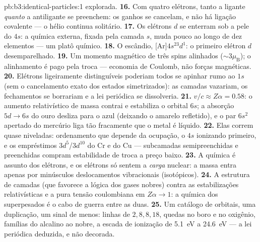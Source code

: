 \begin{solution}{pb:b3:identical-particles:1}
explorada.
\textbf{16.} Com quatro elétrons, tanto a ligante \emph{quanto} a
antiligante se preenchem: os ganhos se cancelam, e não há ligação
covalente --- o hélio continua solitário.
\textbf{17.} Os elétrons $d$ se enterram sob a pele do $4s$: a química
externa, fixada pela camada $s$, muda pouco ao longo de dez elementos
--- um platô químico.
\textbf{18.} O escândio, [Ar]$4s^23d^1$: o primeiro elétron $d$
desemparelhado.
\textbf{19.} Um momento magnético de três spins alinhados
($\sim3\mu_{\text{B}}$); o alinhamento é pago pela troca --- economia
de Coulomb, não forças magnéticas.
\textbf{20.} Elétrons ligeiramente distinguíveis poderiam todos se
apinhar rumo ao $1s$ (sem o cancelamento exato dos estados
simetrizados): as camadas vazariam, os fechamentos se borrariam e a lei
periódica se dissolveria.
\textbf{21.} $v/c \approx Z\alpha = 0.58$: o aumento relativístico de
massa contrai e estabiliza o orbital $6s$; a absorção $5d \to 6s$ do
ouro desliza para o azul (deixando o amarelo refletido), e o par $6s^2$
apertado do mercúrio liga tão fracamente que o metal é líquido.
\textbf{22.} Elas correm quase niveladas: ordenamento que depende da
ocupação, o $4s$ ionizando primeiro, e os empréstimos $3d^5$/$3d^{10}$
do Cr e do Cu --- subcamadas semipreenchidas e preenchidas compram
estabilidade de troca a preço baixo.
\textbf{23.} A química é assunto dos elétrons, e os elétrons só sentem
a \emph{carga} nuclear: a massa entra apenas por minúsculos
deslocamentos vibracionais (isotópicos).
\textbf{24.} A estrutura de camadas (que favorece a lógica dos gases
nobres) contra as estabilizações relativísticas e a pura tensão
coulombiana em $Z\alpha \to 1$: a química dos superpesados é o
cabo de guerra entre as duas.
\textbf{25.} Um catálogo de orbitais, uma duplicação, um sinal de
menos: linhas de $2, 8, 8, 18$, quedas no boro e no oxigênio, famílias
do alcalino ao nobre, a escada de ionização de \qty{5.1}{eV} a
\qty{24.6}{eV} --- a lei periódica deduzida, e não decorada.
\end{solution}

